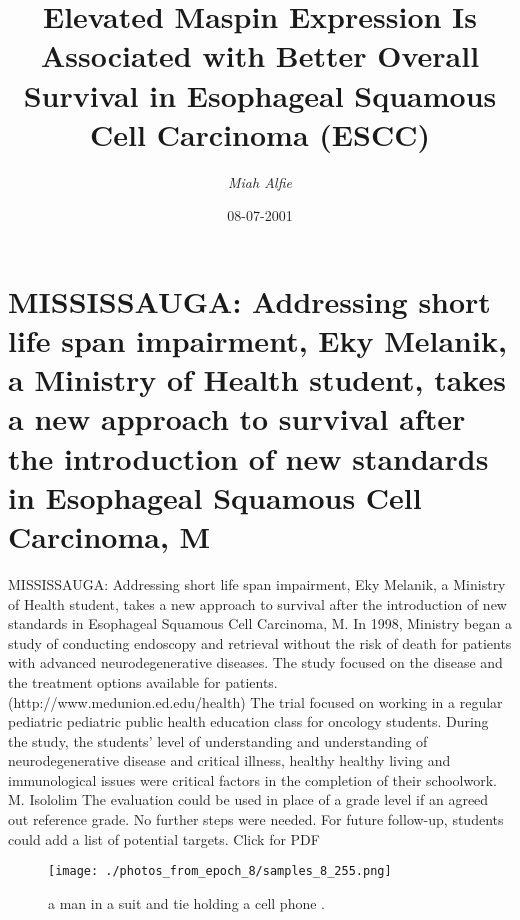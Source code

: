 \documentclass{article}%
\title{Elevated Maspin Expression Is Associated with Better Overall Survival in Esophageal Squamous Cell Carcinoma (ESCC)}%
\author{\textit{Miah Alfie}}%
\date{08-07-2001}%
\begin{document}
%
\normalsize%
\maketitle%
\section{MISSISSAUGA:\newline%
Addressing short life span impairment, Eky Melanik, a Ministry of Health student, takes a new approach to survival after the introduction of new standards in Esophageal Squamous Cell Carcinoma, M}%
\label{sec:MISSISSAUGAAddressingshortlifespanimpairment,EkyMelanik,aMinistryofHealthstudent,takesanewapproachtosurvivalaftertheintroductionofnewstandardsinEsophagealSquamousCellCarcinoma,M}%
MISSISSAUGA:\newline%
Addressing short life span impairment, Eky Melanik, a Ministry of Health student, takes a new approach to survival after the introduction of new standards in Esophageal Squamous Cell Carcinoma, M. In 1998, Ministry began a study of conducting endoscopy and retrieval without the risk of death for patients with advanced neurodegenerative diseases. The study focused on the disease and the treatment options available for patients. (http://www.medunion.ed.edu/health)\newline%
The trial focused on working in a regular pediatric pediatric public health education class for oncology students. During the study, the students’ level of understanding and understanding of neurodegenerative disease and critical illness, healthy healthy living and immunological issues were critical factors in the completion of their schoolwork.\newline%
M. Isololim\newline%
The evaluation could be used in place of a grade level if an agreed out reference grade. No further steps were needed. For future follow{-}up, students could add a list of potential targets.\newline%
Click for PDF\newline%

%


\begin{figure}[h!]%
\centering%
\texttt{[image: ./photos\_from\_epoch\_8/samples\_8\_255.png]}%
\caption{a man in a suit and tie holding a cell phone .}%
\end{figure}

%
\end{document}
